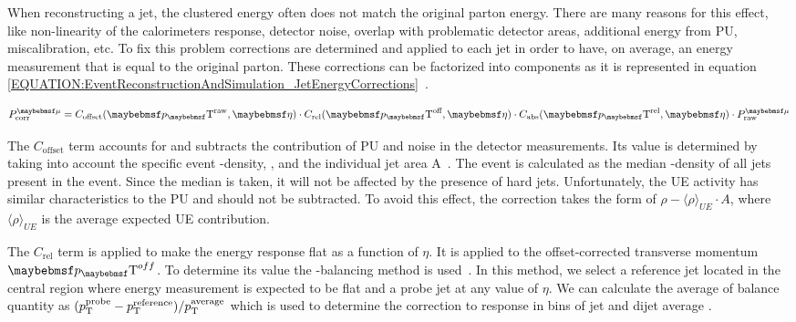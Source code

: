 
When reconstructing a jet, the clustered energy often does not match the original parton energy. There are many reasons for this effect, like non-linearity of the calorimeters response, detector noise, overlap with problematic detector areas, additional energy from \gls{PU}, miscalibration, etc. To fix this problem corrections are determined and applied to each jet in order to have, on average, an energy measurement that is equal to the original parton. These corrections can be factorized into components as it is represented in equation \ref{EQUATION:EventReconstructionAndSimulation_JetEnergyCorrections}~\cite{ARTICLE:CMSDeterminationJetEnergyCalibration}.

\begin{equation}
P_{\text{corr}}^{\mu} = C_{\text{offset}}(\pT^{\text{raw}},\eta) \cdot C_{\text{rel}}(\pT^{\text{off}},\eta) \cdot C_{\text{abs}}(\pT^{\text{rel}},\eta) \cdot P_{\text{raw}}^{\mu}
\label{EQUATION:EventReconstructionAndSimulation_JetEnergyCorrections}
\end{equation}

The $C_{\text{offset}}$ term accounts for and subtracts the contribution of \gls{PU} and noise in the detector measurements. Its value is determined by taking into account the specific event \pt-density, \rho, and the individual jet area A~\cite{ARTICLE:PileupSubtractionJetAreas}. The event \rho is calculated as the median \pt-density of all jets present in the event. Since the median is taken, it will not be affected by the presence of hard jets. Unfortunately, the \gls{UE} activity has similar characteristics to the \gls{PU} and should not be subtracted. To avoid this effect, the correction takes the form of $\rho - \langle \rho \rangle_{UE} \cdot A$, where $\langle \rho \rangle_{UE}$ is the average expected \gls{UE} contribution.

The $C_{\text{rel}}$ term is applied to make the energy response flat as a function of $\eta$. It is applied to the offset-corrected transverse momentum $\pT^{off}$. To determine its value the \pt-balancing method is used~\cite{ARTICLE:CMSDeterminationJetEnergyCalibration}. In this method, we select a reference jet located in the central region where energy measurement is expected to be flat and a probe jet at any value of $\eta$. We can calculate the average of balance quantity as $(p_{\mathrm{T}}^{\text{probe}} - p_{\mathrm{T}}^{\text{reference}} ) / p_{\mathrm{T}}^{\text{average}}$ which is used to determine the correction to response in bins of jet \eta and dijet average \pt. 

